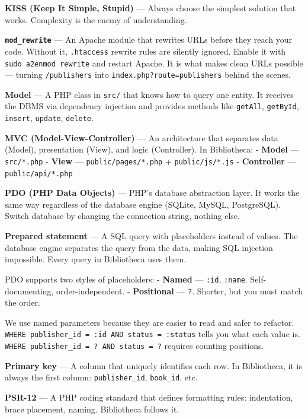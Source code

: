 \documentclass[11pt,a4paper,oneside]{book}
\begin{document}
\textbf{KISS (Keep It Simple, Stupid)} --- Always choose the
simplest solution that works. Complexity is the enemy of
understanding.

\textbf{\texttt{mod\_rewrite}} --- An Apache module that rewrites
URLs before they reach your code. Without it, \texttt{.htaccess}
rewrite rules are silently ignored. Enable it with
\texttt{sudo\ a2enmod\ rewrite} and restart Apache. It is what
makes clean URLs possible --- turning \texttt{/publishers} into
\texttt{index.php?route=publishers} behind the scenes.

\textbf{Model} --- A PHP class in \texttt{src/} that knows how to
query one entity. It receives the DBMS via dependency injection
and provides methods like \texttt{getAll}, \texttt{getById},
\texttt{insert}, \texttt{update}, \texttt{delete}.

\textbf{MVC (Model-View-Controller)} --- An architecture that
separates data (Model), presentation (View), and logic
(Controller). In Bibliotheca: - \textbf{Model} ---
\texttt{src/*.php} - \textbf{View} ---
\texttt{public/pages/*.php} + \texttt{public/js/*.js} -
\textbf{Controller} --- \texttt{public/api/*.php}

\textbf{PDO (PHP Data Objects)} --- PHP's database abstraction
layer. It works the same way regardless of the database engine
(SQLite, MySQL, PostgreSQL). Switch database by changing the
connection string, nothing else.

\textbf{Prepared statement} --- A SQL query with placeholders
instead of values. The database engine separates the query from
the data, making SQL injection impossible. Every query in
Bibliotheca uses them.

PDO supports two styles of placeholders: - \textbf{Named} ---
\texttt{:id}, \texttt{:name}. Self-documenting,
order-independent. - \textbf{Positional} --- \texttt{?}. Shorter,
but you must match the order.

We use named parameters because they are easier to read and safer
to refactor.
\texttt{WHERE\ publisher\_id\ =\ :id\ AND\ status\ =\ :status}
tells you what each value is.
\texttt{WHERE\ publisher\_id\ =\ ?\ AND\ status\ =\ ?} requires
counting positions.

\textbf{Primary key} --- A column that uniquely identifies each
row. In Bibliotheca, it is always the first column:
\texttt{publisher\_id}, \texttt{book\_id}, etc.

\textbf{PSR-12} --- A PHP coding standard that defines formatting
rules: indentation, brace placement, naming. Bibliotheca follows
it.
\end{document}
